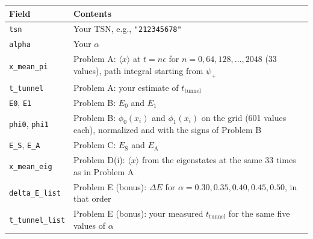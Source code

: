 \begin{center}
  \begin{tabular}{@{}lp{}@{}}
    \toprule
    Field                                  & Contents                                                                                                                                     \\
    \midrule
    \texttt{tsn}                           & Your TSN, e.g., \texttt{"212345678"}                                                                                                         \\
    \texttt{alpha}                         & Your $\alpha$                                                                                                                                \\
    \texttt{x\_mean\_pi}                   & Problem A: $\langle x\rangle$ at $t = n\epsilon$ for $n = 0, 64, 128, \ldots, 2048$ (33 values), path integral starting from $\psi_+$         \\
    \texttt{t\_tunnel}                     & Problem A: your estimate of $t_\mathrm{tunnel}$                                                                                              \\
    \texttt{E0}, \texttt{E1}               & Problem B: $E_0$ and $E_1$                                                                                                                   \\
    \texttt{phi0}, \texttt{phi1}           & Problem B: $\phi_0(x_i)$ and $\phi_1(x_i)$ on the grid (601 values each), normalized and with the signs of Problem B                       \\
    \texttt{E\_S}, \texttt{E\_A}           & Problem C: $E_\mathrm{S}$ and $E_\mathrm{A}$                                                                                                 \\
    \texttt{x\_mean\_eig}                  & Problem D(i): $\langle x\rangle$ from the eigenstates at the same 33 times as in Problem A                                                 \\
    \texttt{delta\_E\_list}                & Problem E (bonus): $\Delta E$ for $\alpha = 0.30, 0.35, 0.40, 0.45, 0.50$, in that order                                                         \\
    \texttt{t\_tunnel\_list}               & Problem E (bonus): your measured $t_\mathrm{tunnel}$ for the same five values of $\alpha$                                                        \\
    \bottomrule
  \end{tabular}
\end{center}

